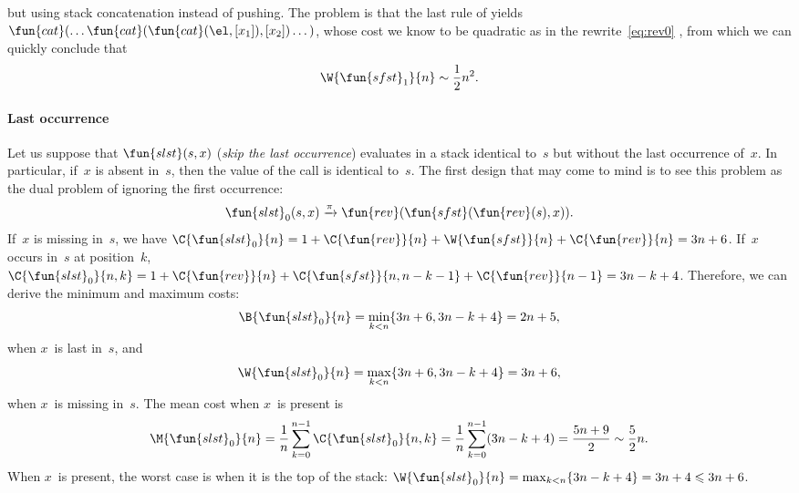 but using stack concatenation instead of pushing. The problem is that
the last rule of 
 yields
\(\fun{cat}(\dots\fun{cat}(\fun{cat}(\el,[x_1]),[x_2])\dots)\), whose
cost we know to be quadratic  as in the
rewrite~\eqref{eq:rev0}
, from which we can
quickly conclude that
\begin{equation*}
  \W{\fun{sfst}_1}{n} \sim \frac{1}{2}n^2.
\end{equation*}

\paragraph{Last occurrence}

Let us suppose that \(\fun{slst}(s,x)\)
(\emph{skip the last occurrence}) evaluates in a stack identical
to~\(s\) but without the last occurrence of~\(x\). In particular,
if~\(x\) is absent in~\(s\), then the value of the call is identical
to~\(s\). The first design that may come to mind is to see this
problem as the dual problem of ignoring the first occurrence:
\begin{equation}
\fun{slst}_0(s,x) \xrightarrow{\smash{\pi}}
                  \fun{rev}(\fun{sfst}(\fun{rev}(s),x)).
\label{eq:slst0}
\end{equation}
If~\(x\) is missing in~\(s\), we
have
\(\C{\fun{slst}_0}{n} = 1 + \C{\fun{rev}}{n} + \W{\fun{sfst}}{n} +
\C{\fun{rev}}{n} = 3n+6\). If~\(x\) occurs in~\(s\) at position~\(k\),
\(\C{\fun{slst}_0}{n,k} = 1 + \C{\fun{rev}}{n} +
\C{\fun{sfst}}{n,n-k-1} + \C{\fun{rev}}{n-1} = 3n - k +
4\). Therefore, we can derive the minimum and
maximum costs:
\begin{equation*}
\abovedisplayskip=0pt
\belowdisplayskip=0pt
\B{\fun{slst}_0}{n} = \min_{k < n}\{3n+6,3n-k+4\} = 2n + 5,
\end{equation*}
when \(x\)~is last in~\(s\), and
\begin{equation*}
\abovedisplayskip=0pt
\belowdisplayskip=0pt
\W{\fun{slst}_0}{n} = \max_{k < n}\{3n+6,3n-k+4\} = 3n+6,
\end{equation*}
when \(x\)~is missing in~\(s\).  The
mean cost when \(x\)~is present is
\begin{equation*}
\abovedisplayskip=0pt
\belowdisplayskip=0pt
\M{\fun{slst}_0}{n} = \frac{1}{n}\sum_{k=0}^{n-1}\C{\fun{slst}_0}{n,k}
                    = \frac{1}{n}\sum_{k=0}^{n-1}(3n - k + 4)
                    = \frac{5n+9}{2} \sim \frac{5}{2}n.
\end{equation*}
When \(x\)~is present, the worst case is when it is the top of the
stack: \(\W{\fun{slst}_0}{n} = \max_{k<n}\{3n - k + 4\} = 3 n+ 4
\leqslant 3n + 6\).

